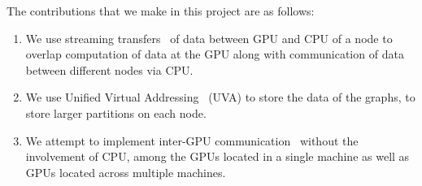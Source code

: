 The contributions that we make in this project are as follows:
\begin{enumerate}
\item We use streaming transfers~\cite{async-cuda} of data between GPU and CPU of a node to overlap computation of data at the GPU along with communication of data between different nodes via CPU. 
\item We use Unified Virtual Addressing~\cite{uva-cuda} (UVA) to store the data of the graphs, to store larger partitions on each node. 
\item We attempt to implement inter-GPU communication~\cite{rdma-cuda} without the involvement of CPU, among the GPUs located in a single machine as well as GPUs located across multiple machines. 
\end{enumerate}
